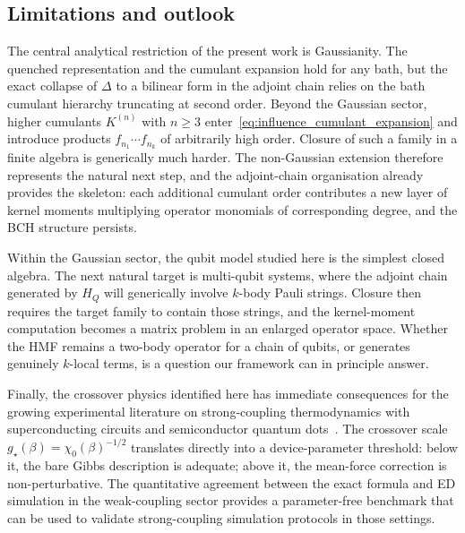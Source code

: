\subsection*{Limitations and outlook}

The central analytical restriction of the present work is Gaussianity.
The quenched representation and the cumulant expansion hold for any bath,
but the exact collapse of $\Delta$ to a bilinear form in the adjoint chain
relies on the bath cumulant hierarchy truncating at second order.
Beyond the Gaussian sector, higher cumulants $K^{(n)}$ with $n \geq 3$
enter~\eqref{eq:influence_cumulant_expansion} and introduce products
$f_{n_1}\cdots f_{n_k}$ of arbitrarily high order.
Closure of such a family in a finite algebra is generically much harder.
The non-Gaussian extension therefore represents the natural next step,
and the adjoint-chain organisation already provides the skeleton: each
additional cumulant order contributes a new layer of kernel moments
multiplying operator monomials of corresponding degree, and the BCH
structure persists.

Within the Gaussian sector, the qubit model studied here is the
simplest closed algebra.
The next natural target is multi-qubit systems, where the adjoint chain
generated by $H_Q$ will generically involve $k$-body Pauli strings.
Closure then requires the target family to contain those strings, and the
kernel-moment computation becomes a matrix problem in an enlarged operator
space.
Whether the HMF remains a two-body operator for a chain of qubits, or
generates genuinely $k$-local terms, is a question our framework can
in principle answer.

Finally, the crossover physics identified here has immediate consequences
for the growing experimental literature on strong-coupling thermodynamics
with superconducting circuits and semiconductor quantum dots~\cite{campbellRoadmapQuantumThermodynamics2026,binderThermodynamicsQuantumRegime2018}.
The crossover scale $g_\star(\beta) = \chi_0(\beta)^{-1/2}$ translates
directly into a device-parameter threshold: below it, the bare Gibbs
description is adequate; above it, the mean-force correction is
non-perturbative.
The quantitative agreement between the exact formula and ED simulation in
the weak-coupling sector provides a parameter-free benchmark that can be
used to validate strong-coupling simulation protocols in those settings.


